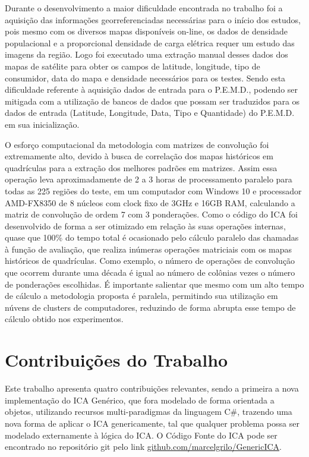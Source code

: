 Durante o desenvolvimento a maior dificuldade encontrada no trabalho foi a aquisição das informações georreferenciadas necessárias para o início dos estudos, pois mesmo com os diversos mapas disponíveis on-line, os dados de densidade populacional e a proporcional densidade de carga elétrica requer um estudo das imagens da região. Logo foi executado uma extração manual desses dados dos mapas de satélite para obter os campos de latitude, longitude, tipo de consumidor, data do mapa e densidade necessários para os testes. Sendo esta dificuldade referente à aquisição dados de entrada para o P.E.M.D., podendo ser mitigada com a utilização de bancos de dados que possam ser traduzidos para os dados de entrada (Latitude, Longitude, Data, Tipo e Quantidade) do P.E.M.D. em sua inicialização.

O esforço computacional da metodologia com matrizes de convolução foi extremamente alto, devido à busca de correlação dos mapas históricos em quadrículas para a extração dos melhores padrões em matrizes. Assim essa operação leva aproximadamente de 2 a 3 horas de processamento paralelo para todas as 225 regiões do teste, em um computador com Windows 10 e processador AMD-FX8350 de 8 núcleos com clock fixo de 3GHz e 16GB RAM, calculando a matriz de convolução de ordem 7 com 3 ponderações. Como o código do ICA foi desenvolvido de forma a ser otimizado em relação às suas operações internas, quase que 100\% do tempo total é ocasionado pelo cálculo paralelo das chamadas à função de avaliação, que realiza inúmeras operações matriciais com os mapas históricos de quadrículas. Como exemplo, o número de operações de convolução que ocorrem durante uma década é igual ao número de colônias vezes o número de ponderações escolhidas. É importante salientar que mesmo com um alto tempo de cálculo a metodologia proposta é paralela, permitindo sua utilização em núvens de clusters de computadores, reduzindo de forma abrupta esse tempo de cálculo obtido nos experimentos.

\section{Contribuições do Trabalho}
\label{colaborações_do_trabalho}


Este trabalho apresenta quatro contribuições relevantes, sendo a primeira a nova implementação do ICA Genérico, que fora modelado de forma orientada a objetos, utilizando recursos multi-paradigmas da linguagem C\#, trazendo uma nova forma de aplicar o ICA genericamente, tal que qualquer problema possa ser modelado externamente à lógica do ICA. O Código Fonte do ICA pode ser encontrado no repositório git pelo link \url{github.com/marcelgrilo/GenericICA}.

